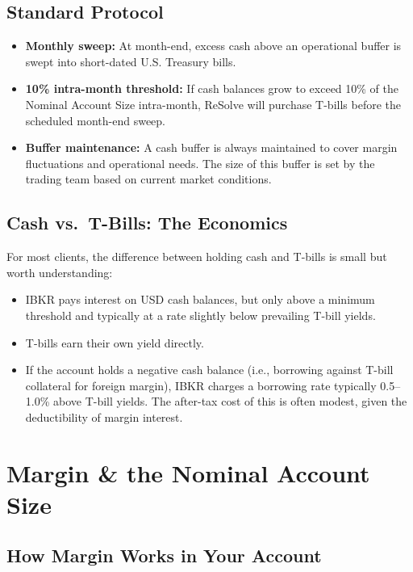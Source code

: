 \documentclass{resolve-whitepaper}
\providecommand{\tightlist}{%
  \setlength{\itemsep}{0pt}\setlength{\parskip}{0pt}}
\begin{document}
\subsection{Standard Protocol}\label{standard-protocol}

\begin{itemize}
\tightlist
\item
  \textbf{Monthly sweep:} At month-end, excess cash above an operational
  buffer is swept into short-dated U.S. Treasury bills.
\item
  \textbf{10\% intra-month threshold:} If cash balances grow to exceed
  10\% of the Nominal Account Size intra-month, ReSolve will purchase
  T-bills before the scheduled month-end sweep.
\item
  \textbf{Buffer maintenance:} A cash buffer is always maintained to
  cover margin fluctuations and operational needs. The size of this
  buffer is set by the trading team based on current market conditions.
\end{itemize}

\subsection{Cash vs.~T-Bills: The
Economics}\label{cash-vs.-t-bills-the-economics}

For most clients, the difference between holding cash and T-bills is
small but worth understanding:

\begin{itemize}
\tightlist
\item
  IBKR pays interest on USD cash balances, but only above a minimum
  threshold and typically at a rate slightly below prevailing T-bill
  yields.
\item
  T-bills earn their own yield directly.
\item
  If the account holds a negative cash balance (i.e., borrowing against
  T-bill collateral for foreign margin), IBKR charges a borrowing rate
  typically 0.5--1.0\% above T-bill yields. The after-tax cost of this
  is often modest, given the deductibility of margin interest.
\end{itemize}

\section{Margin \& the Nominal Account
Size}\label{margin-the-nominal-account-size}

\subsection{How Margin Works in Your
Account}\label{how-margin-works-in-your-account}
\end{document}
